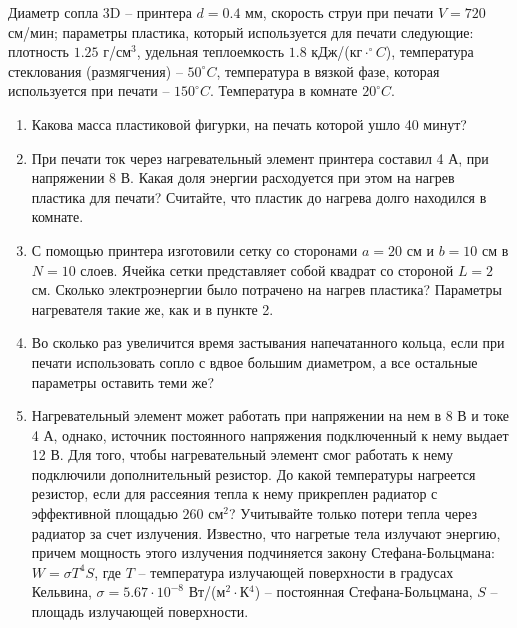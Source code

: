 
Диаметр сопла 3D – принтера $d = 0.4$ мм, скорость струи при печати $V = 720$ см/мин; параметры пластика, который используется для печати следующие: плотность $1.25$ г/см$^3$, удельная теплоемкость $1.8$ кДж/(кг$\cdot^{\circ}C$), температура стеклования (размягчения) – $50^{\circ}C$, температура в вязкой фазе, которая используется при печати – $150^{\circ}C$. Температура в комнате $20^{\circ}C$.

\begin{enumerate}
    \item Какова масса пластиковой фигурки, на печать которой ушло 40 минут?
    \item При печати ток через нагревательный элемент принтера составил 4 А, при напряжении 8 В. Какая доля энергии расходуется при этом на нагрев пластика для печати? Считайте, что пластик до нагрева долго находился в комнате.
    \item С помощью принтера изготовили сетку со сторонами $a= 20$ см и $b = 10$ см в $N = 10$ слоев. Ячейка сетки представляет собой квадрат со стороной $L = 2$ см. Сколько электроэнергии было потрачено на нагрев пластика? Параметры нагревателя такие же, как и в пункте 2.
    \item Во сколько раз увеличится время застывания напечатанного кольца, если при печати использовать сопло с вдвое большим диаметром, а все остальные параметры оставить теми же?
    \item Нагревательный элемент может работать при напряжении на нем в 8 В и токе 4 А, однако, источник постоянного напряжения подключенный к нему выдает 12 В. Для того, чтобы нагревательный элемент смог работать к нему подключили дополнительный резистор. До какой температуры нагреется резистор, если для рассеяния тепла к нему прикреплен радиатор с эффективной площадью $260$ см$^2$? Учитывайте только потери тепла через радиатор за счет излучения. Известно, что нагретые тела излучают энергию, причем мощность этого излучения подчиняется закону Стефана-Больцмана: $W=\sigma T^4S$,  где $T$ – температура излучающей поверхности в градусах Кельвина, $\sigma=5.67\cdot10^{-8}$ Вт/(м$^2\cdot$К$^4$) – постоянная Стефана-Больцмана, $S$ – площадь излучающей поверхности.
\end{enumerate}